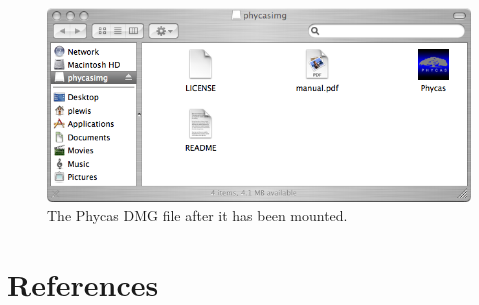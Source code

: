 \documentclass[10pt]{article}
\begin{document}
%
%
\begin{figure}[t]
\begin{center}
\begin{minipage}{5.in}
\hfil\includegraphics[scale=0.5]{images/phycasdmg}\hfil
\caption{\small The Phycas DMG file after it has been mounted.}
\label{phycasdmg}
\end{minipage}
\end{center}
\end{figure}

\section*{References}
\renewcommand{\bibsection}{}


\printindex
\end{document}
